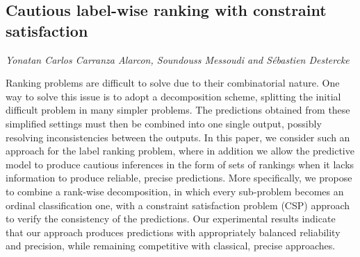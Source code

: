 \documentclass[../booklet.tex]{subfiles}
\begin{document}
\subsection[Cautious label-wise ranking with constraint satisfaction. {\it Yonatan Carlos Carranza Alarcon, Soundouss Messoudi and Sébastien Destercke}]{Cautious label-wise ranking with constraint satisfaction}
  

\begin{center}
  {\it Yonatan Carlos Carranza Alarcon, Soundouss Messoudi and Sébastien Destercke}
\end{center}

\vskip 0.8cm


Ranking problems are difficult to solve due to their combinatorial nature. One way to solve this issue is to adopt a decomposition scheme, splitting the initial difficult problem in many simpler problems. The predictions obtained from these simplified settings must then be combined into one single output, possibly resolving inconsistencies between the outputs. In this paper, we consider such an approach for the label ranking problem, where in addition we allow the predictive model to produce cautious inferences in the form of sets of rankings when it lacks information to produce reliable, precise predictions. More specifically, we propose to combine a rank-wise decomposition, in which every sub-problem becomes an ordinal classification one, with a constraint satisfaction problem (CSP) approach to verify the consistency of the predictions. Our experimental results indicate that our approach produces predictions with appropriately balanced reliability and precision, while remaining competitive with classical, precise approaches.
\end{document}
